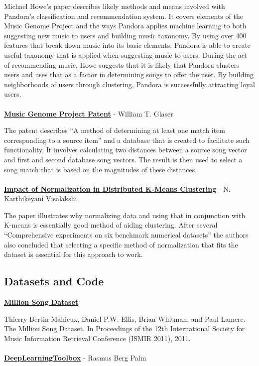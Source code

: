 \documentclass[12pt]{article}
\begin{document}
Michael Howe's paper describes likely methods and means involved with Pandora's classification and recommendation system. It covers elements of the Music Genome Project and the ways Pandora applies machine learning to both suggesting new music to users and building music taxonomy. By using over 400 features that break down music into its basic elements, Pandora is able to create useful taxonomy that is applied when suggesting music to users. During the act of recommending music, Howe suggests that it is likely that Pandora clusters users and uses that as a factor in determining songs to offer the user. By building neighborhoods of users through clustering, Pandora is successfully attracting loyal users.
\\
\\
\href{http://www.google.com/patents/US7003515?dq=7,003,515}{\textbf{Music Genome Project Patent}} - William T. Glaser 

The patent describes  ``A method of determining at least one match item corresponding to a source item'' and a database that is created to facilitate such functionality. It involves calculating two distances between a source song vector and  first and second database song vectors. The result is then used to select a song match that is based on the magnitudes of these distances.
\\
\\
\href{http://www.medwelljournals.com/fulltext/?doi=ijscomp.2009.168.172}{\textbf{Impact of Normalization in Distributed K-Means Clustering}} - N. Karthikeyani Visalakshi 

The paper illustrates why normalizing data and using that in conjunction with K-means is essentially good method of aiding clustering. After several ``Comprehensive experiments on six benchmark numerical datasets'' the authors also concluded that selecting a specific method of normalization that fits the dataset is essential for this approach to work.

\subsection{Datasets and Code}
\label{subsec:datasetsAndCode}
\href{http://labrosa.ee.columbia.edu/millionsong/}{\textbf{Million Song Dataset}}

Thierry Bertin-Mahieux, Daniel P.W. Ellis, Brian Whitman, and Paul Lamere. 
The Million Song Dataset. In Proceedings of the 12th International Society
for Music Information Retrieval Conference (ISMIR 2011), 2011.
\\
\\
\href{https://github.com/rasmusbergpalm/DeepLearnToolbox}{\textbf{DeepLearningToolbox}} - Rasmus Berg Palm
\end{document}
